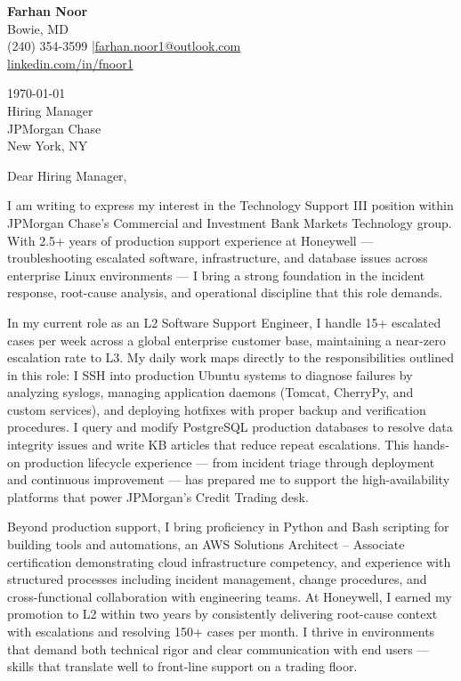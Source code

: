 \documentclass[11pt,letterpaper]{article}
\begin{document}
\begin{flushleft}
{\large\bfseries Farhan Noor} \\[2pt]
Bowie, MD \\
(240) 354-3599 \enspace|\enspace \href{mailto:farhan.noor1@outlook.com}{farhan.noor1@outlook.com} \\
\href{https://linkedin.com/in/fnoor1}{linkedin.com/in/fnoor1}
\end{flushleft}

\vspace{0.5em}

\begin{flushleft}
\today \\[0.5em]
Hiring Manager \\
JPMorgan Chase \\
New York, NY
\end{flushleft}

\vspace{0.5em}

Dear Hiring Manager,

I am writing to express my interest in the Technology Support III position within JPMorgan Chase's Commercial and Investment Bank Markets Technology group. With 2.5+ years of production support experience at Honeywell --- troubleshooting escalated software, infrastructure, and database issues across enterprise Linux environments --- I bring a strong foundation in the incident response, root-cause analysis, and operational discipline that this role demands.

In my current role as an L2 Software Support Engineer, I handle 15+ escalated cases per week across a global enterprise customer base, maintaining a near-zero escalation rate to L3. My daily work maps directly to the responsibilities outlined in this role: I SSH into production Ubuntu systems to diagnose failures by analyzing syslogs, managing application daemons (Tomcat, CherryPy, and custom services), and deploying hotfixes with proper backup and verification procedures. I query and modify PostgreSQL production databases to resolve data integrity issues and write KB articles that reduce repeat escalations. This hands-on production lifecycle experience --- from incident triage through deployment and continuous improvement --- has prepared me to support the high-availability platforms that power JPMorgan's Credit Trading desk.

Beyond production support, I bring proficiency in Python and Bash scripting for building tools and automations, an AWS Solutions Architect -- Associate certification demonstrating cloud infrastructure competency, and experience with structured processes including incident management, change procedures, and cross-functional collaboration with engineering teams. At Honeywell, I earned my promotion to L2 within two years by consistently delivering root-cause context with escalations and resolving 150+ cases per month. I thrive in environments that demand both technical rigor and clear communication with end users --- skills that translate well to front-line support on a trading floor.
\end{document}
